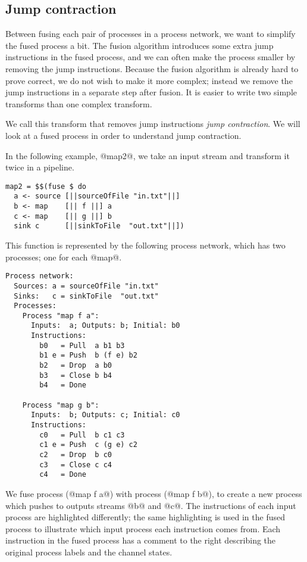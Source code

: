 \subsection{Jump contraction}
Between fusing each pair of processes in a process network, we want to simplify the fused process a bit.
The fusion algorithm introduces some extra jump instructions in the fused process, and we can often make the process smaller by removing the jump instructions.
Because the fusion algorithm is already hard to prove correct, we do not wish to make it more complex; instead we remove the jump instructions in a separate step after fusion.
It is easier to write two simple transforms than one complex transform.

We call this transform that removes jump instructions \emph{jump contraction}.
We will look at a fused process in order to understand jump contraction.

In the following example, @map2@, we take an input stream and transform it twice in a pipeline.

\begin{lstlisting}
map2 = $$(fuse $ do
  a <- source [||sourceOfFile "in.txt"||]
  b <- map    [|| f ||] a
  c <- map    [|| g ||] b
  sink c      [||sinkToFile  "out.txt"||])
\end{lstlisting}

This function is represented by the following process network, which has two processes; one for each @map@.

\begin{lstlisting}[linebackgroundcolor={
  \hilineFst{8}
  \hilineFst{9}
  \hilineFst{10}
  \hilineFst{11}
  \hilineFst{12}
  \hilineSnd{17}
  \hilineSnd{18}
  \hilineSnd{19}
  \hilineSnd{20}
  \hilineSnd{21}
  }]
Process network:
  Sources: a = sourceOfFile "in.txt"
  Sinks:   c = sinkToFile  "out.txt"
  Processes:
    Process "map f a":
      Inputs:  a; Outputs: b; Initial: b0
      Instructions:
        b0   = Pull  a b1 b3
        b1 e = Push  b (f e) b2
        b2   = Drop  a b0
        b3   = Close b b4        
        b4   = Done

    Process "map g b":
      Inputs:  b; Outputs: c; Initial: c0
      Instructions:
        c0   = Pull  b c1 c3      
        c1 e = Push  c (g e) c2     
        c2   = Drop  b c0
        c3   = Close c c4         
        c4   = Done
\end{lstlisting}

We fuse process (@map f a@) with process (@map f b@), to create a new process which pushes to outputs streams @b@ and @c@.
The instructions of each input process are highlighted differently; the same highlighting is used in the fused process to illustrate which input process each instruction comes from.
Each instruction in the fused process has a comment to the right describing the original process labels and the channel states.

